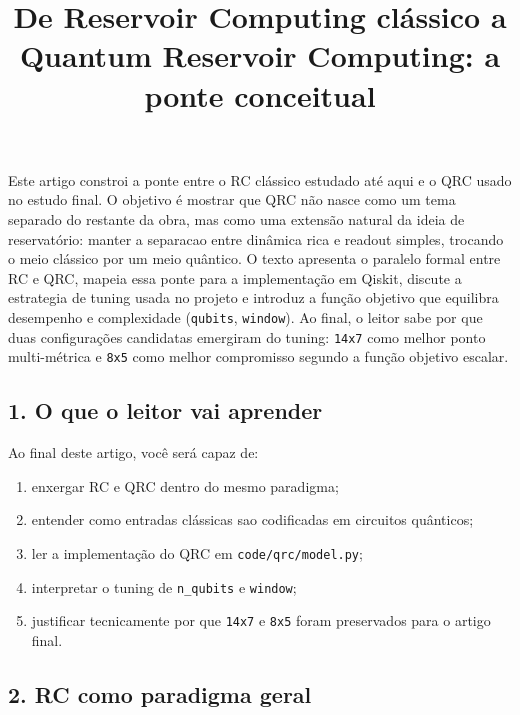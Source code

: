\documentclass[12pt]{article}
\title{De Reservoir Computing clássico a Quantum Reservoir Computing: a ponte conceitual}
\author{}
\providecommand{\tightlist}{%
          \setlength{\itemsep}{0pt}\setlength{\parskip}{0pt}}
\begin{document}
        \maketitle

        \begin{resumo}
        Este artigo constroi a ponte entre o RC clássico estudado até aqui e o QRC usado no estudo final. O objetivo é mostrar que QRC não nasce como um tema separado do restante da obra, mas como uma extensão natural da ideia de reservatório: manter a separacao entre dinâmica rica e readout simples, trocando o meio clássico por um meio quântico. O texto apresenta o paralelo formal entre RC e QRC, mapeia essa ponte para a implementação em Qiskit, discute a estrategia de tuning usada no projeto e introduz a função objetivo que equilibra desempenho e complexidade (\texttt{qubits}, \texttt{window}). Ao final, o leitor sabe por que duas configurações candidatas emergiram do tuning: \texttt{14x7} como melhor ponto multi-métrica e \texttt{8x5} como melhor compromisso segundo a função objetivo escalar.
        \end{resumo}

        \subsection{1. O que o leitor vai aprender}\label{1-o-que-o-leitor-vai-aprender}

Ao final deste artigo, você será capaz de:

\begin{enumerate}
\def\labelenumi{\arabic{enumi}.}
\tightlist
\item
  enxergar RC e QRC dentro do mesmo paradigma;
\item
  entender como entradas clássicas sao codificadas em circuitos quânticos;
\item
  ler a implementação do QRC em \texttt{code/qrc/model.py};
\item
  interpretar o tuning de \texttt{n\_qubits} e \texttt{window};
\item
  justificar tecnicamente por que \texttt{14x7} e \texttt{8x5} foram preservados para o artigo final.
\end{enumerate}

\subsection{2. RC como paradigma geral}\label{2-rc-como-paradigma-geral}
\end{document}
